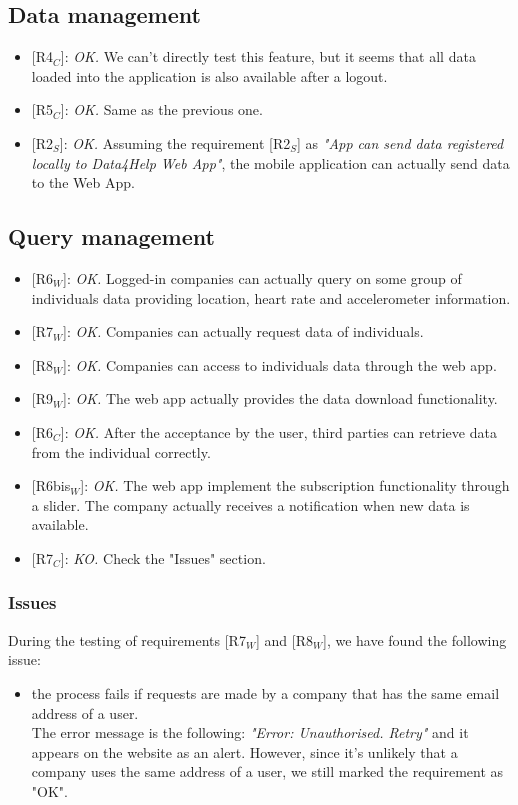 \documentclass{article}
\begin{document}
\subsection{Data management}
\begin{itemize}
	\item {[R4$_C$]}: \textit{OK.} We can't directly test this feature, but it seems that all data loaded into the application is also available after a logout.
	\item {[R5$_C$]}: \textit{OK.} Same as the previous one.
	\item {[R2$_S$]}: \textit{OK.} Assuming the requirement {[R2$_S$]} as \textit{"App can send data registered locally to Data4Help Web App"}, the mobile application can actually send data to the Web App.
\end{itemize}

\subsection{Query management}

\begin{itemize}
	\item {[R6$_W$]}: \textit{OK.} Logged-in companies can actually query on some group of individuals data providing location, heart rate and accelerometer information.
	\item {[R7$_W$]}: \textit{OK.} Companies can actually request data of individuals. 
	\item {[R8$_W$]}: \textit{OK.} Companies can access to individuals data through the web app.
	\item {[R9$_W$]}: \textit{OK.} The web app actually provides the data download functionality.
	\item {[R6$_C$]}: \textit{OK.} After the acceptance by the user, third parties can retrieve data from the individual correctly. 
	\item {[R6bis$_W$]}: \textit{OK.} The web app implement the subscription functionality through a slider. The company actually receives a notification when new data is available.
	\item {[R7$_C$]}: \textit{KO.} Check the "Issues" section.
\end{itemize}

\subsubsection{Issues}
During the testing of requirements {[R7$_W$]} and {[R8$_W$]}, we have found the following issue:
\begin{itemize}
	\item the process fails if requests are made by a company that has the same email address of a user. \\The error message is the following: \textit{"Error: Unauthorised. Retry"} and it appears on the website as an alert. However, since it's unlikely that a company uses the same address of a user, we still marked the requirement as "OK".
\end{itemize}
\end{document}

